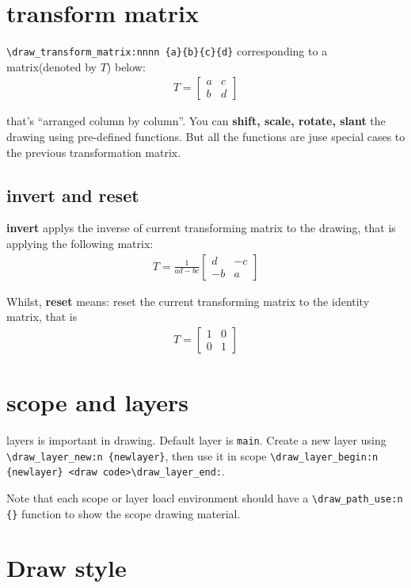 \documentclass{article}
\begin{document}
\section{transform matrix}
\verb|\draw_transform_matrix:nnnn {a}{b}{c}{d}| corresponding to a matrix(denoted by $T$) below:
\begin{align}
  T = 
  \begin{bmatrix}
    a & c \\
    b & d
  \end{bmatrix}
\end{align}

that's ``arranged column by column''. You can \textbf{shift, scale, rotate, slant} the drawing using pre-defined 
functions. But all the functions are juse special cases to the previous transformation matrix.

\subsection{invert and reset}
\textbf{invert} applys the inverse of current transforming matrix to the drawing, that is applying the 
following matrix:
\begin{align}
  T = \frac{1}{ad-bc}
  \begin{bmatrix}
    d & -c \\
    -b & a
  \end{bmatrix}
\end{align}

Whilst, \textbf{reset} means: reset the current transforming matrix to the identity matrix, that is 
\begin{align}
  T = 
  \begin{bmatrix}
    1 & 0 \\
    0 & 1
  \end{bmatrix}
\end{align}


\section{scope and layers}
layers is important in drawing. Default layer is \verb|main|. Create a new layer using \verb|\draw_layer_new:n {newlayer}|,
then use it in scope \verb|\draw_layer_begin:n {newlayer} <draw code>\draw_layer_end:|.

Note that each scope or layer loacl environment should have a \verb|\draw_path_use:n {}| function to show the scope 
drawing material.

\section{Draw style}
\end{document}

